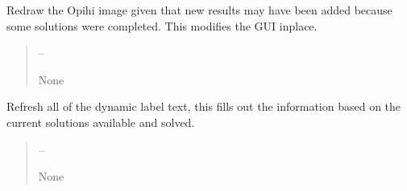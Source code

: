\documentclass[letterpaper,11pt,english]{sphinxmanual}
\begin{document}
\begin{savenotes}
\begin{fulllineitems}
\begin{savenotes}\begin{fulllineitems}
\label{\detokenize{code/opihiexarata.gui.manual:opihiexarata.gui.manual.OpihiManualWindow.redraw_opihi_image}}
\pysigstartsignatures
{}
\pysigstopsignatures
\sphinxAtStartPar
Redraw the Opihi image given that new results may have been added
because some solutions were completed. This modifies the GUI in\sphinxhyphen{}place.
\begin{quote}\begin{description}
\sphinxAtStartPar
{} – 

\sphinxAtStartPar
None

\end{description}\end{quote}

\end{fulllineitems}\end{savenotes}


\begin{savenotes}\begin{fulllineitems}
\label{\detokenize{code/opihiexarata.gui.manual:opihiexarata.gui.manual.OpihiManualWindow.refresh_dynamic_label_text}}
\pysigstartsignatures
{}
\pysigstopsignatures
\sphinxAtStartPar
Refresh all of the dynamic label text, this fills out the
information based on the current solutions available and solved.
\begin{quote}\begin{description}
\sphinxAtStartPar
{} – 

\sphinxAtStartPar
None

\end{description}\end{quote}

\end{fulllineitems}\end{savenotes}


\end{fulllineitems}
\end{savenotes}
\end{document}
